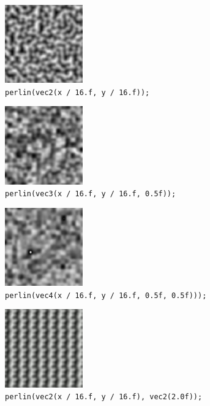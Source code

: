 \documentclass{scrartcl}
\numberwithin{figure}{subsection}
\begin{document}
\begin{figure}
  \centering
  \includegraphics[width=0.3\textwidth]{perlin1}
  \cprotect\caption{\verb|perlin(vec2(x / 16.f, y / 16.f));|}
\end{figure}

\begin{figure}
  \centering
  \includegraphics[width=0.3\textwidth]{perlin2}
  \cprotect\caption{\verb|perlin(vec3(x / 16.f, y / 16.f, 0.5f));|}
\end{figure}

\begin{figure}
  \centering
  \includegraphics[width=0.3\textwidth]{perlin3}
  \cprotect\caption{\verb|perlin(vec4(x / 16.f, y / 16.f, 0.5f, 0.5f)));|}
\end{figure}

\begin{figure}
  \centering
  \includegraphics[width=0.3\textwidth]{perlin4}
  \cprotect\caption{\verb|perlin(vec2(x / 16.f, y / 16.f), vec2(2.0f));|}
\end{figure}
\end{document}
